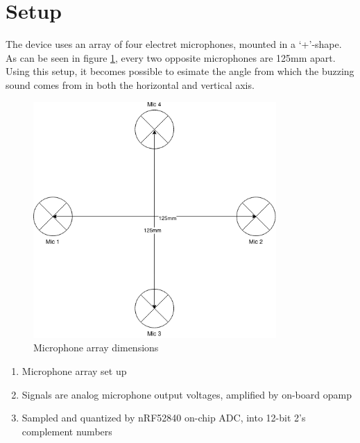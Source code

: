 \documentclass[a4paper]{article}
\begin{document}
\section{Setup}

The device uses an array of four electret microphones, mounted in a `+'-shape. As can be seen in figure \ref{fig:mic_array_dimensions}, every two opposite microphones are 125mm apart. Using this setup, it becomes possible to esimate the angle from which the buzzing sound comes from in both the horizontal and vertical axis. 

\begin{figure}
    \begin{center}
        \includegraphics[width=25em]{assets/mic_array_dimensions.png}
        \caption{Microphone array dimensions}
        \label{fig:mic_array_dimensions}
    \end{center}
\end{figure}


\begin{enumerate}
    \item Microphone array set up
    \item Signals are analog microphone output voltages, amplified by on-board opamp
    \item Sampled and quantized by nRF52840 on-chip ADC, into 12-bit 2's complement numbers
\end{enumerate}
\end{document}
